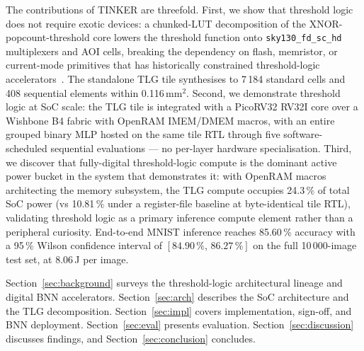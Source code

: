 \documentclass[conference]{IEEEtran}
\begin{document}
The contributions of TINKER are threefold. First, we show that
threshold logic does not require exotic devices: a chunked-LUT
decomposition of the XNOR-popcount-threshold core lowers the
threshold function onto \texttt{sky130\_fd\_sc\_hd} multiplexers
and AOI cells, breaking the dependency on flash, memristor, or
current-mode primitives that has historically constrained
threshold-logic accelerators~\cite{tulip,
papandroulidakis2019practical, beiu2003differential}. The
standalone TLG tile synthesises to 7\,184 standard cells and
408 sequential elements within 0.116\,mm$^2$. Second, we
demonstrate threshold logic at SoC scale: the TLG tile is
integrated with a PicoRV32 RV32I core over a Wishbone B4 fabric
with OpenRAM IMEM/DMEM macros, with an entire grouped binary MLP
hosted on the same tile RTL through five software-scheduled
sequential evaluations --- no per-layer hardware specialisation.
Third, we discover that fully-digital threshold-logic compute is
the dominant active power bucket in the system that demonstrates
it: with OpenRAM macros architecting the memory subsystem, the
TLG compute occupies 24.3\,\% of total SoC power
(vs 10.81\,\% under a register-file baseline at byte-identical
tile RTL), validating threshold logic as a primary inference
compute element rather than a peripheral curiosity. End-to-end
MNIST inference reaches 85.60\,\% accuracy with a 95\,\% Wilson
confidence interval of \([84.90\,\%,\,86.27\,\%]\) on the full
10\,000-image test set, at 8.06\,\textmu J per image.

Section~\ref{sec:background} surveys the threshold-logic
architectural lineage and digital BNN accelerators.
Section~\ref{sec:arch} describes the SoC architecture and the
TLG decomposition. Section~\ref{sec:impl} covers implementation,
sign-off, and BNN deployment. Section~\ref{sec:eval} presents
evaluation. Section~\ref{sec:discussion} discusses findings, and
Section~\ref{sec:conclusion} concludes.

\end{document}
